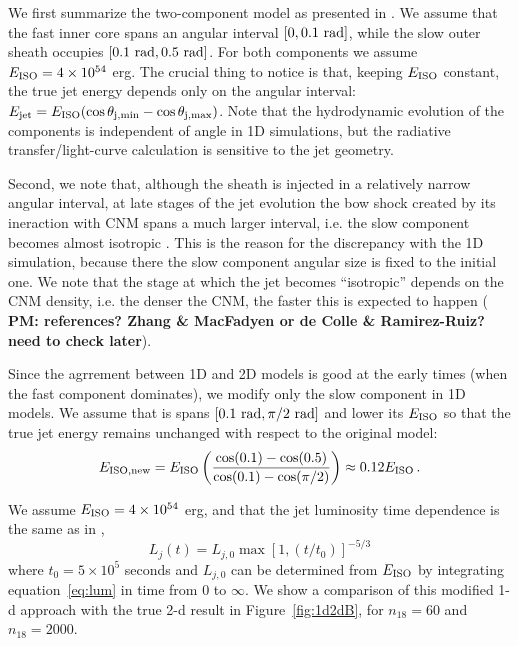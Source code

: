 \documentclass[usenatbib,fleqn]{mnras}
\begin{document}
We first summarize the two-component model as presented in
\citet{Mimica+2015}. We assume that the fast inner core spans an
angular interval $[0, 0.1\ {\rm rad}]$, while the slow outer sheath
occupies $[0.1\ {\rm rad}, 0.5\ {\rm rad}]$. For both components we
assume $E_{\rm ISO} = 4\times 10^{54}$ erg. The crucial thing to
notice is that, keeping $E_{\rm ISO}$ constant, the true jet energy
depends only on the angular interval: $E_{\rm jet} = E_{\rm ISO}
(\cos\theta_{\rm j,min} - \cos\theta_{\rm j,max})$. Note that the
hydrodynamic evolution of the components is independent of angle in 1D
simulations, but the radiative transfer/light-curve calculation is
sensitive to the jet geometry.

Second, we note that, although the sheath is injected in a relatively
narrow angular interval, at late stages of the jet evolution the bow
shock created by its ineraction with CNM spans a much larger interval,
i.e. the slow component becomes almost isotropic \citep[bottom two
panels in Fig. 8 in][]{Mimica+2015}. This is the reason for the
discrepancy with the 1D simulation, because there the slow component
angular size is fixed to the initial one. We note that the stage at
which the jet becomes ``isotropic'' depends on the CNM density,
i.e. the denser the CNM, the faster this is expected to happen ({\bf
  PM: references? Zhang \& MacFadyen or de Colle \& Ramirez-Ruiz? need
  to check later}).

Since the agrrement between 1D and 2D models is good at the early times (when the fast component dominates), we modify only the slow component in 1D models. We assume that is spans $[0.1\ {\rm rad}, \pi/2\ {\rm rad}]$ and lower its $E_{\rm ISO}$ so that the true jet energy remains unchanged with respect to the original model:
\begin{equation}\label{eq:Eiso}
 E_{\rm ISO, new} = E_{\rm ISO} \left(\frac{\cos(0.1) - \cos(0.5)}{\cos(0.1) - \cos(\pi/2)}\right)\approx 0.12 E_{\rm ISO}\, .
\end{equation}

We assume $E_{\rm ISO} = 4\times 10^{54}$ erg, and that the jet luminosity time dependence is the same as in \citet{Mimica+2015},
\begin{equation}\label{eq:lum}
L_j(t) = L_{j,0}\max\left[1, (t/t_0)\right]^{-5/3}
\end{equation}
where $t_0 = 5\times 10^5$ seconds and $L_{j, 0}$ can be determined from $E_{\rm ISO}$ by integrating equation~\ref{eq:lum} in time from $0$ to $\infty$. We show a comparison of this modified 1-d approach with the true 2-d result in Figure~\ref{fig:1d2dB}, for $n_{18}=60$ and $n_{18}=2000$.
\end{document}
